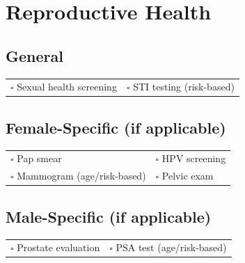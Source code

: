 
\section{Reproductive Health}
\label{sec:reproductory}

\subsection{General}

\begin{tabular}{p{9cm} p{8cm}}
$\square$ Sexual health screening & $\square$ STI testing (risk-based) \\  
\end{tabular}

\subsection{Female-Specific (if applicable)}

\begin{tabular}{p{9cm} p{8cm}}
$\square$ Pap smear & $\square$ HPV screening\\ 
$\square$ Mammogram (age/risk-based) & $\square$ Pelvic exam \\ 
\end{tabular}

\subsection{Male-Specific (if applicable)}

\begin{tabular}{p{9cm} p{8cm}}
$\square$ Prostate evaluation & $\square$ PSA test (age/risk-based) \\ 
\end{tabular}

